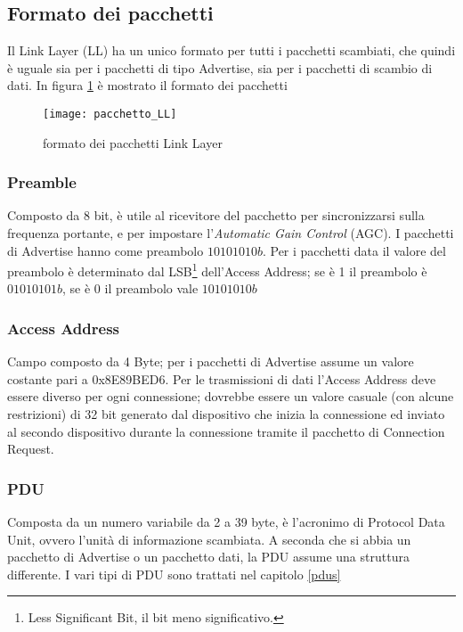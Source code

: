 \subsection{Formato dei pacchetti}

Il Link Layer (LL) ha un unico formato per tutti i pacchetti scambiati, che quindi è uguale sia per i pacchetti di tipo Advertise, sia per i pacchetti di scambio di dati.
In figura \ref{pacchetto_LL} è mostrato il formato dei pacchetti

\begin{figure}[H]
\texttt{[image: pacchetto\_LL]}
\centering
\caption{formato dei pacchetti Link Layer}
\label{pacchetto_LL}
\end{figure}

\subsubsection{Preamble}
Composto da 8 bit, è utile al ricevitore del pacchetto per sincronizzarsi sulla frequenza portante, e per impostare l'\emph{Automatic Gain Control} (AGC).
I pacchetti di Advertise hanno come preambolo $10101010b$. Per i pacchetti data il valore del preambolo è determinato dal LSB\footnote{Less Significant Bit, il bit meno significativo.} dell'Access Address; se è 1 il preambolo è $01010101b$, se è 0 il preambolo vale $10101010b$

\subsubsection{Access Address}\label{access_address}
Campo composto da 4 Byte; per i pacchetti di Advertise assume un valore costante pari a 0x8E89BED6. Per le trasmissioni di dati l'Access Address deve essere diverso per ogni connessione; dovrebbe essere un valore casuale (con alcune restrizioni) di 32 bit generato dal dispositivo che inizia la connessione ed inviato al secondo dispositivo durante la connessione tramite il pacchetto di Connection Request. 

\subsubsection{PDU}
Composta da un numero variabile da 2 a 39 byte, è l'acronimo di Protocol Data Unit, ovvero l'unità di informazione scambiata. A seconda che si abbia un pacchetto di Advertise o un pacchetto dati, la PDU assume una struttura differente. I vari tipi di PDU sono trattati nel capitolo \ref{pdus}

